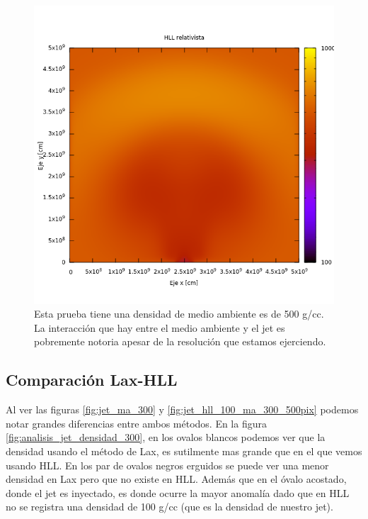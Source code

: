 \documentclass[12pt,a4paper]{book}
\begin{document}
\begin{figure}[H] %
\centering
\includegraphics[scale=0.5]{./Figuras/Pruebas/Prueba_jet/hll/jet_hll_100_ma_500_500pix} 
\caption{Esta prueba tiene una densidad de medio ambiente es de 500 g/cc. La interacción que hay entre el medio ambiente y el jet es pobremente notoria apesar de la resolución que estamos ejerciendo.}
\end{figure}

\subsection{Comparación Lax-HLL}

Al ver las figuras \ref{fig:jet_ma_300} y \ref{fig:jet_hll_100_ma_300_500pix} podemos notar grandes diferencias entre ambos métodos. En la figura \ref{fig:analisis_jet_densidad_300}, en los ovalos blancos podemos ver que la densidad usando el método de Lax, es sutilmente mas grande que en el que vemos usando HLL. En los par de ovalos negros erguidos se puede ver una menor densidad en Lax pero que no existe en HLL. Además que en el óvalo acostado, donde el jet es inyectado, es donde ocurre la mayor anomalía dado que en HLL no se registra una densidad de 100 g/cc (que es la densidad de nuestro jet).
\end{document}
